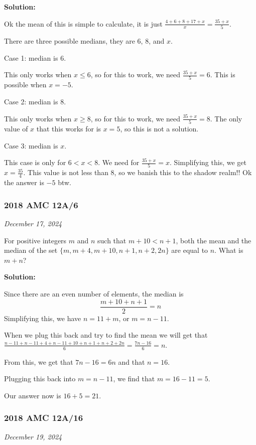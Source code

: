 \documentclass[../mathproblems.tex]{subfiles}
\begin{document}
\textbf{Solution:}

Ok the mean of this is simple to calculate, it is just $\frac{4+6+8+17+x}{x} = \frac{35+x}{5}$.

There are three possible medians, they are $6$, $8$, and $x$.

Case 1: median is $6$.

This only works when $x\leq 6$, so for this to work, we need $\frac{35+x}{5}=6$. This is possible when $x=-5$.

Case 2: median is $8$.

This only works when $x\geq 8$, so for this to work, we need $\frac{35+x}{5}=8$. The only value of $x$ that this works for is $x=5$, so this is not a solution.

Case 3: median is $x$.

This case is only for $6 <x <8$. We need for $\frac{35+x}{5}=x$. Simplifying this, we get $x=\frac{35}{4}$. This value is not less than $8$, so we banish this to the shadow realm!! Ok the answer is $\boxed{-5}$ btw.

\noindent\hrulefill

\subsubsection*{2018 AMC 12A/6}
\textit{December 17, 2024}

For positive integers $m$ and $n$ such that $m+10<n+1$, both the mean and the median of the set $\{m, m+4, m+10, n+1, n+2, 2n\}$ are equal to $n$. What is $m+n$?

\textbf{Solution:}

Since there are an even number of elements, the median is 
\[ \frac{m+10+n+1}{2} = n \]
Simplifying this, we have $n=11+m$, or $m=n-11$.

When we plug this back and try to find the mean we will get that $\frac{n-11+n-11+4+n-11+10+n+1+n+2+2n}{6} = \frac{7n-16}{6} = n$.

From this, we get that $7n-16 = 6n$ and that $n=16$.

Plugging this back into $m=n-11$, we find that $m=16-11 = 5$. 

Our answer now is $16+5 = \boxed{21}$.

\noindent\hrulefill

\subsubsection*{2018 AMC 12A/16}
\textit{December 19, 2024}
\end{document}
